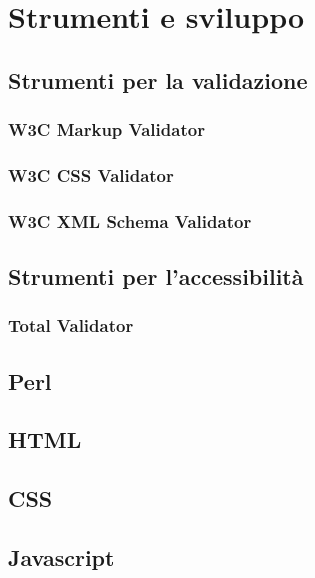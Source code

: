 \section{Strumenti e sviluppo} %
	\subsection{Strumenti per la validazione}
	
		\subsubsection{W3C Markup Validator}
		
		\subsubsection{W3C CSS Validator}		
		
		\subsubsection{W3C XML Schema Validator}
	
	\subsection{Strumenti per l'accessibilità}
	
		\subsubsection{Total Validator}
		
	
	\subsection{Perl}
	
	\subsection{HTML}
	\subsection{CSS}
	\subsection{Javascript}
